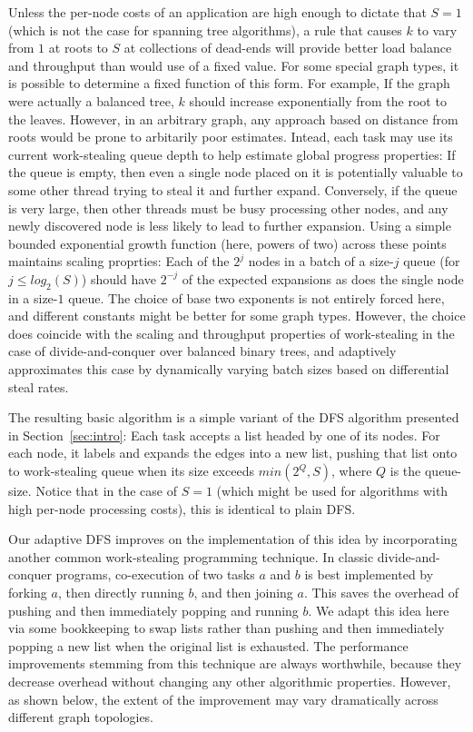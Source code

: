 Unless the per-node costs of an application are high enough to dictate
that $S=1$ (which is not the case for spanning tree algorithms), a rule
that causes $k$ to vary from $1$ at roots to $S$ at collections of dead-ends
will provide better load balance and throughput than would use of a
fixed value. For some special graph types, it is possible to determine
a fixed function of this form. For example, If the graph were actually
a balanced tree, $k$ should increase exponentially from the root to the
leaves. However, in an arbitrary graph, any approach based on distance
from roots would be prone to arbitarily poor estimates.  Intead, each
task may use its current work-stealing queue depth to help estimate
global progress properties: If the queue is empty, then even a single
node placed on it is potentially valuable to some other thread trying
to steal it and further expand.  Conversely, if the queue is very
large, then other threads must be busy processing other nodes, and any
newly discovered node is less likely to lead to further expansion.
Using a simple bounded exponential growth function (here, powers of
two) across these points maintains scaling proprties: Each of the 
$2^j$ nodes in a batch of a size-$j$ queue (for $j \leq log_2(S)$) should have
$2^{-j}$ of the expected expansions as does the single node in a size-$1$
queue. The choice of base two exponents is not entirely forced here,
and different constants might be better for some graph types.
However, the choice does coincide with the scaling and throughput
properties of work-stealing in the case of divide-and-conquer over
balanced binary trees, and adaptively approximates this case by
dynamically varying batch sizes based on differential steal rates.

The resulting basic algorithm is a simple variant of the DFS algorithm
presented in Section~\ref{sec:intro}: Each task accepts a list headed
by one of its nodes.  For each node, it labels and expands the edges
into a new list, pushing that list onto to work-stealing queue when
its size exceeds $min(2^{Q}, S)$, where $Q$ is the queue-size. Notice
that in the case of $S=1$ (which might be used for algorithms with
high per-node processing costs), this is identical to plain DFS.

Our adaptive DFS improves on the implementation of this idea by
incorporating another common work-stealing programming technique. In
classic divide-and-conquer programs, co-execution of two tasks $a$ and $b$
is best implemented by forking $a$, then directly running $b$, and then
joining $a$.  This saves the overhead of pushing and then immediately
popping and running $b$.  We adapt this idea here via some bookkeeping
to swap lists rather than pushing and then immediately popping a new
list when the original list is exhausted. The performance improvements
stemming from this technique are always worthwhile, because they
decrease overhead without changing any other algorithmic
properties. However, as shown below, the extent of the improvement may
vary dramatically across different graph topologies.

